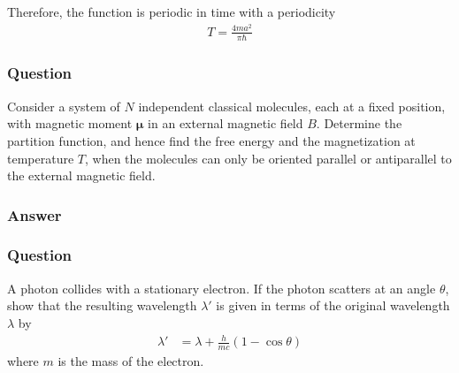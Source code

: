 Therefore, the function is periodic in time with a periodicity
\begin{align}
	\boxed{
	T = \frac{4ma^2}{{\pi}{\hbar}}
	}
\end{align}


\subsubsection{Question}

Consider a system of $N$ independent classical molecules, each at a fixed position, with magnetic moment $\mathbf{\mu}$ in an external magnetic field $B$. Determine the partition function, and hence find the free energy and the magnetization at temperature $T$, when the molecules can only be oriented parallel or antiparallel to the external magnetic field.

\subsubsection{Answer}

\subsubsection{Question}

A photon collides with a stationary electron. If the photon scatters at an
angle $\theta $, show that the resulting wavelength ${\lambda}'$ is given in terms of the
original wavelength ${\lambda}$ by
\begin{align*}
	{\lambda}' &= {\lambda} + \frac{h}{mc} (1 - \cos \theta )
\end{align*}
where $m$ is the mass of the electron.

